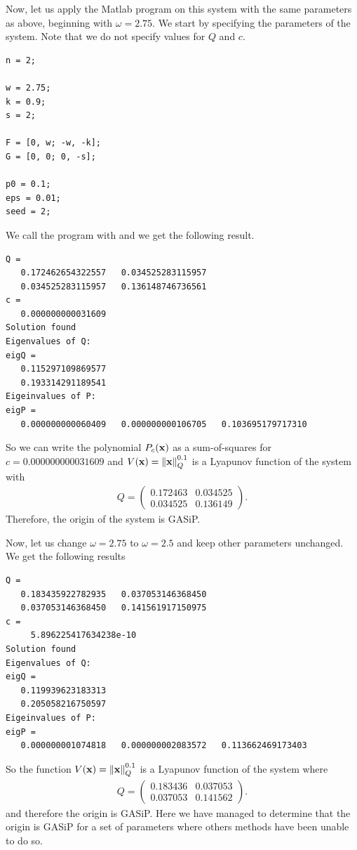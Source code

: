 \documentclass[a4paper,12pt,twoside,BCOR=10mm]{scrbook}
\begin{document}
Now, let us apply the Matlab program on this system with the same parameters as above, beginning with $\omega = 2.75$. We start by specifying the parameters of the system. Note that we do not specify values for $Q$ and $c$.

\begin{lstlisting}
n = 2;

w = 2.75;
k = 0.9;
s = 2;

F = [0, w; -w, -k];
G = [0, 0; 0, -s];

p0 = 0.1;
eps = 0.01;
seed = 2;
\end{lstlisting}
We call the program with  and we get the following result.

\begin{lstlisting}
Q =
   0.172462654322557   0.034525283115957
   0.034525283115957   0.136148746736561
c = 
   0.000000000031609
Solution found
Eigenvalues of Q:
eigQ =
   0.115297109869577
   0.193314291189541
Eigeinvalues of P:
eigP =
   0.000000000060409   0.000000000106705   0.103695179717310
\end{lstlisting}
So we can write the polynomial $P_c(\mathbf{x})$ as a sum-of-squares for $c = 0.000000000031609$ and $V(\mathbf{x}) = \left\lVert\mathbf{x}\right\rVert_{Q}^{0.1}$ is a Lyapunov function of the system with
\begin{align*}
    Q = \begin{pmatrix}
    0.172463 & 0.034525\\
    0.034525 & 0.136149
    \end{pmatrix}.
\end{align*}
Therefore, the origin of the system is GASiP.

Now, let us change $\omega = 2.75$ to $\omega = 2.5$ and keep other parameters unchanged. We get the following results

\begin{lstlisting}
Q =
   0.183435922782935   0.037053146368450
   0.037053146368450   0.141561917150975
c =
     5.896225417634238e-10
Solution found
Eigenvalues of Q:
eigQ =
   0.119939623183313
   0.205058216750597
Eigeinvalues of P:
eigP =
   0.000000001074818   0.000000002083572   0.113662469173403
\end{lstlisting}
So the function $V(\mathbf{x}) = \left\lVert\mathbf{x}\right\rVert_{Q}^{0.1}$ is a Lyapunov function of the system where
\begin{align*}
    Q = \begin{pmatrix}
    0.183436 & 0.037053\\
    0.037053 & 0.141562
    \end{pmatrix}.
\end{align*}
and therefore the origin is GASiP. Here we have managed to determine that the origin is GASiP for a set of parameters where others methods have been unable to do so.
\end{document}
